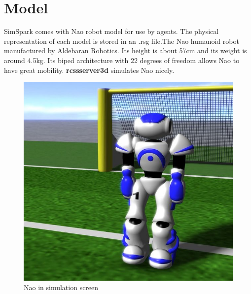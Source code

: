 \section{Model}
SimSpark comes with Nao robot model for use by agents. The physical representation of each model is stored in an .rsg file.The Nao humanoid robot manufactured by Aldebaran Robotics. Its height is about 57cm and its weight is around 4.5kg. Its biped architecture with 22 degrees of freedom allows Nao to have great mobility. { \bf rcssserver3d} simulates Nao nicely.
\begin{figure}[ht]
\centering
  \includegraphics[scale=0.3]{Chapter2/figures/629px-Models-nao.jpg}
  \caption{Nao in simulation screen} 
  \label{fig:Naoinsimulationscreen}
\end{figure}
\label{agent}